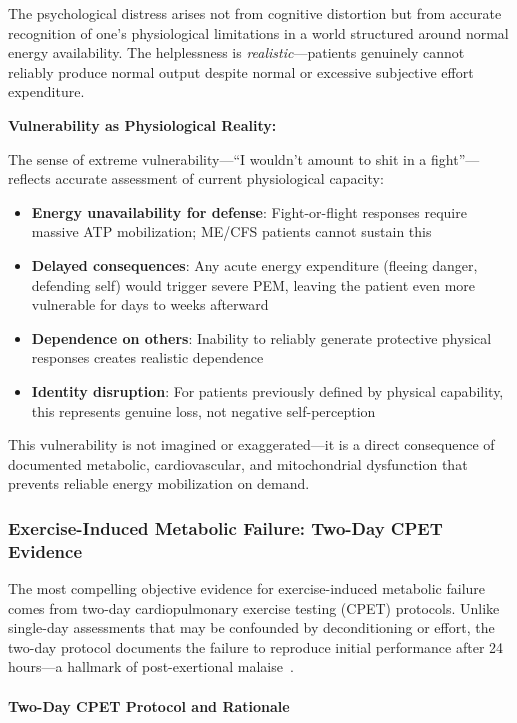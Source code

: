 The psychological distress arises not from cognitive distortion but from accurate recognition of one's physiological limitations in a world structured around normal energy availability. The helplessness is \emph{realistic}---patients genuinely cannot reliably produce normal output despite normal or excessive subjective effort expenditure.

\textbf{Vulnerability as Physiological Reality:}

The sense of extreme vulnerability---``I wouldn't amount to shit in a fight''---reflects accurate assessment of current physiological capacity:

\begin{itemize}
    \item \textbf{Energy unavailability for defense}: Fight-or-flight responses require massive ATP mobilization; ME/CFS patients cannot sustain this
    \item \textbf{Delayed consequences}: Any acute energy expenditure (fleeing danger, defending self) would trigger severe PEM, leaving the patient even more vulnerable for days to weeks afterward
    \item \textbf{Dependence on others}: Inability to reliably generate protective physical responses creates realistic dependence
    \item \textbf{Identity disruption}: For patients previously defined by physical capability, this represents genuine loss, not negative self-perception
\end{itemize}

This vulnerability is not imagined or exaggerated---it is a direct consequence of documented metabolic, cardiovascular, and mitochondrial dysfunction that prevents reliable energy mobilization on demand.

\subsubsection{Exercise-Induced Metabolic Failure: Two-Day CPET Evidence}

The most compelling objective evidence for exercise-induced metabolic failure comes from two-day cardiopulmonary exercise testing (CPET) protocols. Unlike single-day assessments that may be confounded by deconditioning or effort, the two-day protocol documents the failure to reproduce initial performance after 24 hours---a hallmark of post-exertional malaise~\cite{keller2024cpet}.

\paragraph{Two-Day CPET Protocol and Rationale}

